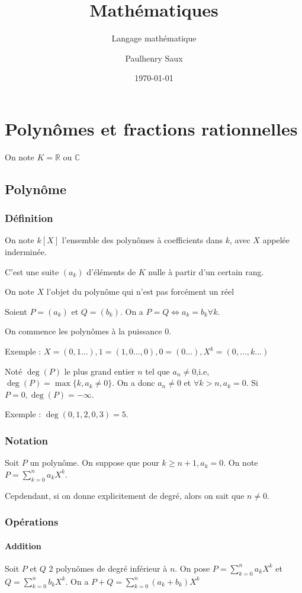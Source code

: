 \documentclass[french]{yLectureNote}
\title{Mathématiques}
\subtitle{Langage mathématique}
\author{Paulhenry Saux}
\date{\today}
\begin{document}
\setcounter{chapter}{6}

	\chapter{Polyn\^omes et fractions rationnelles}
On note $K = \mathbb{R}$ ou $\mathbb{C}$
\section{Polyn\^ome}
\subsection{Définition}
On note $k[X]$ l'ensemble des polyn\^omes à coefficients dans $k$, avec $X$ appelée inderminée.

C'est une suite $(a_k)$ d'éléments de $K$ nulle à partir d'un certain rang.

 On note $X$ l'objet du polyn\^ome qui n'est pas forcément un réel

Soient $P=(a_k)$ et $Q=(b_k)$. On a $P=Q\iff a_k=b_k \forall k$.

On commence les polyn\^omes à la puissance $0$.

Exemple : $X = (0,1\dots), 1=(1,0\dots,0), 0=(0\dots), X^k=(0,\dots,k\dots)$
\begin{definition}
Noté $\deg(P)$ le plus grand entier $n$ tel que $a_n\neq 0$,i.e, $\deg(P) = \max\{k,a_k\neq 0\}$. On a donc $a_n\neq 0$ et $\forall k>n, a_k=0$. Si $P=0, \deg(P) = -\infty$.
\end{definition}
Exemple : $\deg(0,1,2,0,3) = 5$.
\subsection{Notation}
Soit $P$ un polyn\^ome. On suppose que pour $k\geq n+1, a_k =0$. On note $P = \sum^n_{k=0} a_kX^k$.

Cepdendant, si on donne explicitement de degré, alors on sait que $n\neq 0$.
\subsection{Opérations}
\subsubsection{Addition}
Soit $P$ et $Q$ 2 polyn\^omes de degré inférieur à $n$. On pose $P = \sum^n_{k=0} a_kX^k$ et $Q = \sum^n_{k=0} b_kX^k$. On a $P+Q = \sum^n_{k=0} (a_k+b_k)X^k$
\end{document}
